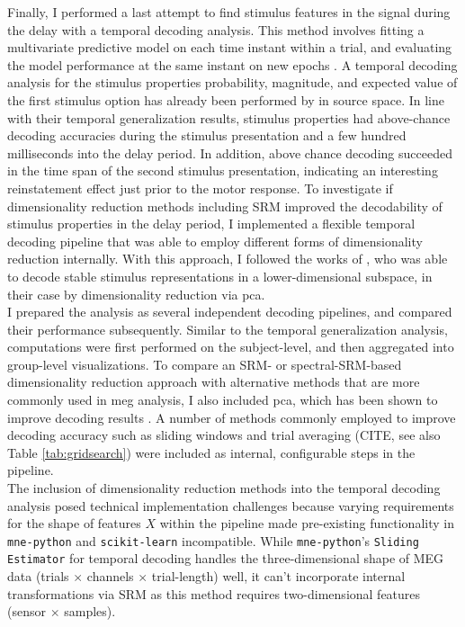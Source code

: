Finally, I performed a last attempt to find stimulus features in the signal during the delay with a temporal decoding analysis.
This method involves fitting a multivariate predictive model on each time instant within a trial, and evaluating the model performance at the same instant on new epochs \citep{king2018encoding}.
A temporal decoding analysis for the stimulus properties probability, magnitude, and expected value of the first stimulus option has already been performed by \citet{kaiserposter} in source space.
In line with their temporal generalization results, stimulus properties had above-chance decoding accuracies during the stimulus presentation and a few hundred milliseconds into the delay period.
In addition, above chance decoding succeeded in the time span of the second stimulus presentation, indicating an interesting reinstatement effect just prior to the motor response.
To investigate if dimensionality reduction methods including \gls{SRM} improved the decodability of stimulus properties in the delay period, I implemented a flexible temporal decoding pipeline that was able to employ different forms of dimensionality reduction internally.
With this approach, I followed the works of \citet{murray2017stable}, who was able to decode stable stimulus representations in a lower-dimensional subspace, in their case by dimensionality reduction via \gls{pca}.\\
I prepared the analysis as several independent decoding pipelines, and compared their performance subsequently.
Similar to the temporal generalization analysis, computations were first performed on the subject-level, and then aggregated into group-level visualizations.
To compare an SRM- or spectral-SRM-based dimensionality reduction approach with alternative methods that are more commonly used in \gls{meg} analysis, I also included \gls{pca}, which has been shown to improve decoding results \citep[see e.g.,][]{grootswagers2017decoding}.
A number of methods commonly employed to improve decoding accuracy such as sliding windows and trial averaging (CITE, see also Table \ref{tab:gridsearch}) were included as internal, configurable steps in the pipeline.\\
The inclusion of dimensionality reduction methods into the temporal decoding analysis posed technical implementation challenges because varying requirements for the shape of features $X$ within the pipeline made pre-existing functionality in \texttt{mne-python} and \texttt{scikit-learn} incompatible.
While \texttt{mne-python}'s \texttt{Sliding Estimator} for temporal decoding handles the three-dimensional shape of MEG data (trials $\times$ channels $\times$ trial-length) well, it can't incorporate internal transformations via \gls{SRM} as this method requires two-dimensional features (sensor $\times$ samples).
